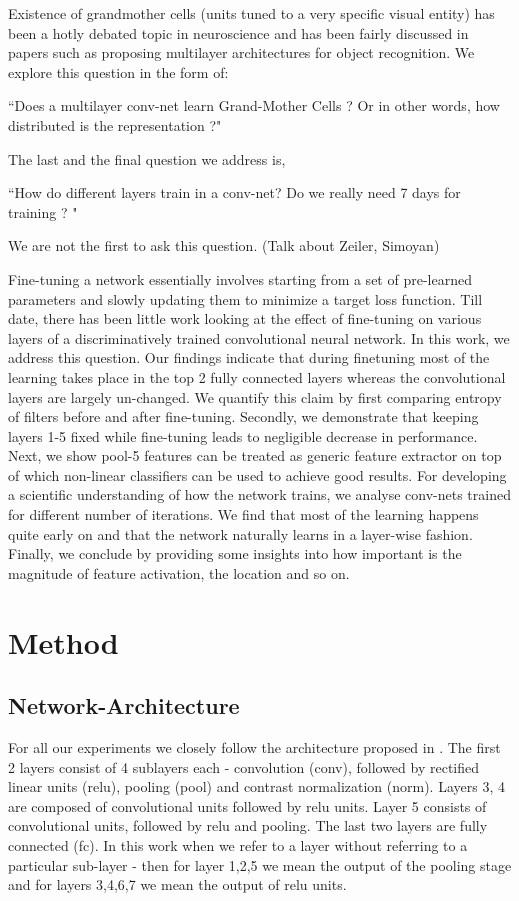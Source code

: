 \documentclass[runningheads]{llncs}
\begin{document}
Existence of grandmother cells (units tuned to a very specific visual entity)  has been a hotly debated topic in neuroscience \cite{Grandmother} and has been fairly discussed in papers such as \cite{GoogleCat} proposing multilayer architectures for object recognition. We explore this question in the form of: 
\begin{center}
``Does a multilayer conv-net learn Grand-Mother Cells ? Or in other words, how distributed is the representation ?" 
\end{center}
The last and the final question we address is,
\begin{center}
``How do different layers train in a conv-net? Do we really need 7 days for training ? "
\end{center}

  
We are not the first to ask this question. \cite{Deconv} \cite{Simonyan} (Talk about Zeiler, Simoyan)

Fine-tuning a network essentially involves starting from a set of pre-learned parameters and slowly updating them to minimize a target loss function. Till date, there has been little work looking at the effect of fine-tuning on various layers of a discriminatively trained convolutional neural network. In this work, we address this question. Our findings indicate that during finetuning most of the learning takes place in the top 2 fully connected layers whereas the convolutional layers are largely un-changed. We quantify this claim by first comparing entropy of filters before and after fine-tuning. Secondly, we demonstrate that keeping layers 1-5 fixed while fine-tuning leads to negligible decrease in performance. Next, we show pool-5 features can be treated as generic feature extractor on top of which non-linear classifiers can be used to achieve good results. For developing a scientific understanding of how the network trains, we analyse conv-nets trained for different number of iterations. We find that most of the learning happens quite early on and that the network naturally learns in a layer-wise fashion. Finally, we conclude by providing some insights into how important is the magnitude of feature activation, the location and so on. 

\section{Method}
\subsection{Network-Architecture}
For all our experiments we closely follow the architecture proposed in \cite{alex}. The first 2 layers consist of 4 sublayers each - convolution (conv), followed by rectified linear units (relu), pooling (pool) and contrast normalization (norm). Layers 3, 4 are composed of convolutional units followed by relu units. Layer 5 consists of convolutional units, followed by relu and pooling. The last two layers are fully connected (fc). In this work when we refer to a layer without referring to a particular sub-layer - then for layer 1,2,5 we mean the output of the pooling stage and for layers 3,4,6,7 we mean the output of relu units.
\end{document}
